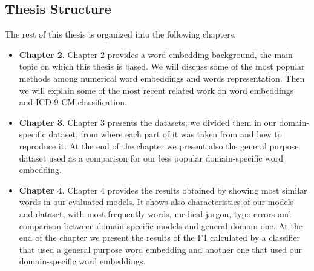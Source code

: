 \subsection{Thesis Structure}
The rest of this thesis is organized into the following chapters:
\begin{itemize}
	\item \textbf{Chapter 2}. Chapter 2 provides a word embedding background, the main topic on which this thesis is based. We will discuss some of the most popular methods among numerical word embeddings and words representation. Then we will explain some of the most recent related work on word embeddings and ICD-9-CM classification.
	\item \textbf{Chapter 3}. Chapter 3 presents the datasets; we divided them in our domain-specific dataset, from where each part of it was taken from and how to reproduce it. At the end of the chapter we present also the general purpose dataset used as a comparison for our less popular domain-specific word embedding.
	\item \textbf{Chapter 4}. Chapter 4 provides the results obtained by showing most similar words in our evaluated models. It shows also characteristics of our models and dataset, with most frequently words, medical jargon, typo errors and comparison between domain-specific models and general domain one. At the end of the chapter we present the results of the F1 calculated by a classifier that used a general purpose word embedding and another one that used our domain-specific word embeddings.
\end{itemize}